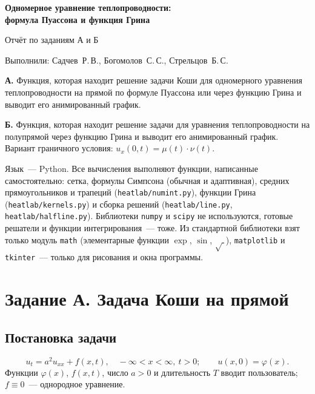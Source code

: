 \documentclass[a4paper,12pt]{article}
\newcommand{\code}[1]{\texttt{#1}}
\begin{document}
\begin{center}
  {\Large\bfseries Одномерное уравнение теплопроводности:\\[2pt]
   формула Пуассона и функция Грина\par}
  \vspace{6pt}
  {Отчёт по заданиям А и Б\par}
  \vspace{4pt}
  {Выполнили: Садчев~Р.\,В., Богомолов~С.\,С., Стрельцов~Б.\,С.\par}
\end{center}

\noindent\textbf{А.} Функция, которая находит решение задачи Коши для
одномерного уравнения теплопроводности на прямой по формуле Пуассона или через
функцию Грина и выводит его анимированный график.

\noindent\textbf{Б.} Функция, которая находит решение задачи для уравнения
теплопроводности на полупрямой через функцию Грина и выводит его анимированный
график. Вариант граничного условия: $u_x(0,t)=\mu(t)\cdot\nu(t)$.

Язык~--- Python. Все вычисления выполняют функции, написанные самостоятельно:
сетка, формулы Симпсона (обычная и адаптивная), средних прямоугольников и трапеций
(\code{heatlab/numint.py}), функции Грина (\code{heatlab/kernels.py}) и сборка
решений (\code{heatlab/line.py}, \code{heatlab/halfline.py}). Библиотеки
\code{numpy} и \code{scipy} не используются, готовые решатели и функции
интегрирования~--- тоже. Из стандартной библиотеки взят только модуль
\code{math} (элементарные функции $\exp$, $\sin$, $\sqrt{\ }$), \code{matplotlib}
и \code{tkinter}~--- только для рисования и окна программы.

\section{Задание А. Задача Коши на прямой}

\subsection{Постановка задачи}

\begin{equation}\label{eq:A}
  u_t=a^{2}u_{xx}+f(x,t),\quad -\infty<x<\infty,\ t>0;\qquad u(x,0)=\varphi(x).
\end{equation}
Функции $\varphi(x)$, $f(x,t)$, число $a>0$ и длительность $T$ вводит
пользователь; $f\equiv0$~--- однородное уравнение.
\end{document}
